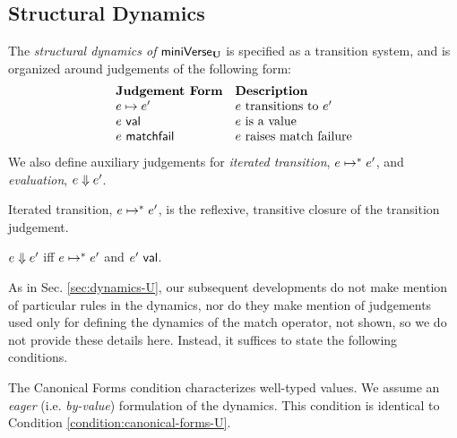 {{{{\subsection{Structural Dynamics}\label{sec:dynamics-UP}
The \emph{structural dynamics of }$\mathsf{miniVerse}_\textbf{U}$ is specified as a transition system, and is organized around judgements of the following form:
\[\begin{array}{ll}
\textbf{Judgement Form} & \textbf{Description}\\
e \mapsto e' & \text{$e$ transitions to $e'$}\\
e~\mathsf{val} & \text{$e$ is a value}\\
e~\mathsf{matchfail} & \text{$e$ raises match failure}
\end{array}\]
We also define auxiliary judgements for \emph{iterated transition}, $e \mapsto^{*} e'$, and \emph{evaluation}, $e \Downarrow e'$.

\begin{definition}\label{defn:iterated-transition-UP} Iterated transition, $e \mapsto^{*} e'$, is the reflexive, transitive closure of the transition judgement.\end{definition}

\begin{definition}[Evaluation]\label{defn:evaluation-UP}  $e \Downarrow e'$ iff $e \mapsto^{*} e'$ and $e'~\mathsf{val}$. \end{definition}

As in Sec. \ref{sec:dynamics-U}, our subsequent developments do not make mention of particular rules in the dynamics, nor do they make mention of judgements used only for defining the dynamics of the match operator, not shown, so we do not provide these details here. Instead, it suffices to state the following conditions.

The Canonical Forms condition characterizes well-typed values. We assume an \emph{eager} (i.e. \emph{by-value}) formulation of the dynamics. This condition is identical to Condition \ref{condition:canonical-forms-U}.

}}}}
